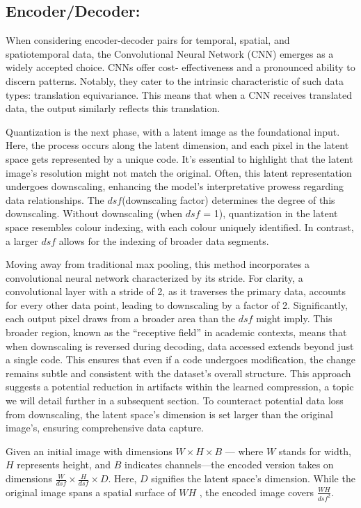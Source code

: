 \documentclass[runningheads]{llncs}
\begin{document}
\subsection{Encoder/Decoder:} 
When considering encoder-decoder pairs for temporal, spatial, and spatiotemporal data, the 
Convolutional Neural Network (CNN) emerges as a widely accepted choice. CNNs offer cost-
effectiveness and a pronounced ability to discern patterns. Notably, they cater to the intrinsic 
characteristic of such data types: translation equivariance. This means that when a CNN receives 
translated data, the output similarly reflects this translation. 
 
Quantization is the next phase, with a latent image as the foundational input. Here, the process occurs 
along the latent dimension, and each pixel in the latent space gets represented by a unique code. It’s 
essential to highlight that the latent image's resolution might not match the original. Often, this latent 
representation undergoes downscaling, enhancing the model's interpretative prowess regarding data 
relationships. The $dsf$(downscaling factor) determines the degree of this downscaling. Without 
downscaling (when $dsf$ = 1), quantization in the latent space resembles colour indexing, with each 
colour uniquely identified. In contrast, a larger $dsf$ allows for the indexing of broader data segments. 
 
Moving away from traditional max pooling, this method incorporates a convolutional neural network 
characterized by its stride. For clarity, a convolutional layer with a stride of 2, as it traverses the 
primary data, accounts for every other data point, leading to downscaling by a factor of 2. Significantly, 
each output pixel draws from a broader area than the $dsf$ might imply. This broader region, known 
as the “receptive field” in academic contexts, means that when downscaling is reversed during 
decoding, data accessed extends beyond just a single code. This ensures that even if a code undergoes 
modification, the change remains subtle and consistent with the dataset’s overall structure. This 
approach suggests a potential reduction in artifacts within the learned compression, a topic we will 
detail further in a subsequent section. To counteract potential data loss from downscaling, the latent 
space’s dimension is set larger than the original image’s, ensuring comprehensive data capture. 
 
Given an initial image with dimensions $W\times H\times B$  — where $W$  stands for width, $H$  represents 
height, and $B$  indicates channels—the encoded version takes on dimensions $\frac{W}{dsf}\times\frac{H}{dsf}\times D$. Here, $D$ 
signifies the latent space's dimension. While the original image spans a spatial surface of $WH$ , the 
encoded image covers $\frac{WH}{dsf^2}$.
 
\end{document}
